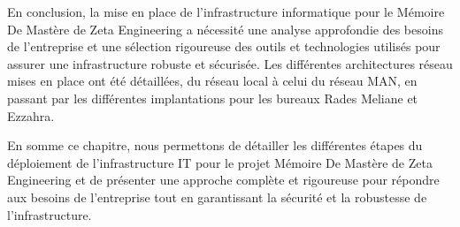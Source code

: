 En conclusion, la mise en place de l'infrastructure informatique pour le Mémoire De Mastère de Zeta Engineering a nécessité une analyse approfondie des besoins de l'entreprise et une sélection rigoureuse des outils et technologies utilisés pour assurer une infrastructure robuste et sécurisée. Les différentes architectures réseau mises en place ont été détaillées, du réseau local à celui du réseau MAN, en passant par les différentes implantations pour les bureaux Rades Meliane et Ezzahra.


En somme ce chapitre, nous permettons de détailler les différentes étapes du déploiement de l'infrastructure IT pour le projet Mémoire De Mastère de Zeta Engineering et de présenter une approche complète et rigoureuse pour répondre aux besoins de l'entreprise tout en garantissant la sécurité et la robustesse de l'infrastructure. 